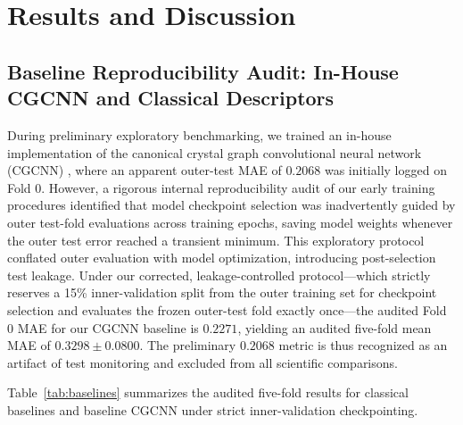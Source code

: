 \documentclass[journal,article,submit,moreauthors,pdftex]{article}
\begin{document}
\section{Results and Discussion}

\subsection{Baseline Reproducibility Audit: In-House CGCNN and Classical Descriptors}
During preliminary exploratory benchmarking, we trained an in-house implementation of the canonical crystal graph convolutional neural network (CGCNN) \cite{xie2018crystal}, where an apparent outer-test MAE of $0.2068$ was initially logged on Fold 0. However, a rigorous internal reproducibility audit of our early training procedures identified that model checkpoint selection was inadvertently guided by outer test-fold evaluations across training epochs, saving model weights whenever the outer test error reached a transient minimum. This exploratory protocol conflated outer evaluation with model optimization, introducing post-selection test leakage. Under our corrected, leakage-controlled protocol---which strictly reserves a 15\% inner-validation split from the outer training set for checkpoint selection and evaluates the frozen outer-test fold exactly once---the audited Fold 0 MAE for our CGCNN baseline is $0.2271$, yielding an audited five-fold mean MAE of $0.3298 \pm 0.0800$. The preliminary $0.2068$ metric is thus recognized as an artifact of test monitoring and excluded from all scientific comparisons.

Table~\ref{tab:baselines} summarizes the audited five-fold results for classical baselines and baseline CGCNN under strict inner-validation checkpointing.
\end{document}
